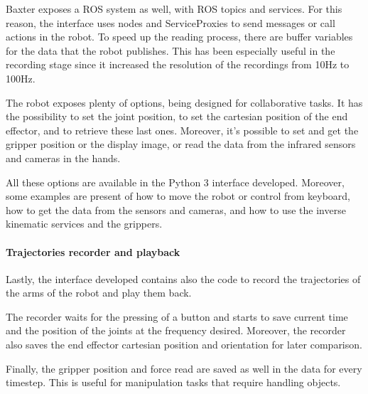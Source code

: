 Baxter exposes a ROS system as well, with ROS topics and services. For this reason, the interface uses nodes and ServiceProxies to send messages or call actions in the robot. To speed up the reading process, there are buffer variables for the data that the robot publishes. This has been especially useful in the recording stage since it increased the resolution of the recordings from 10Hz to 100Hz.

The robot exposes plenty of options, being designed for collaborative tasks. It has the possibility to set the joint position, to set the cartesian position of the end effector, and to retrieve these last ones. Moreover, it's possible to set and get the gripper position or the display image, or read the data from the infrared sensors and cameras in the hands. 

All these options are available in the Python 3 interface developed. Moreover, some examples are present of how to move the robot or control from keyboard, how to get the data from the sensors and cameras, and how to use the inverse kinematic services and the grippers. 

\paragraph{Trajectories recorder and playback} Lastly, the interface developed contains also the code to record the trajectories of the arms of the robot and play them back. 

The recorder waits for the pressing of a button and starts to save current time and the position of the joints at the frequency desired. Moreover, the recorder also saves the end effector cartesian position and orientation for later comparison. 

Finally, the gripper position and force read are saved as well in the data for every timestep. This is useful for manipulation tasks that require handling objects. 

